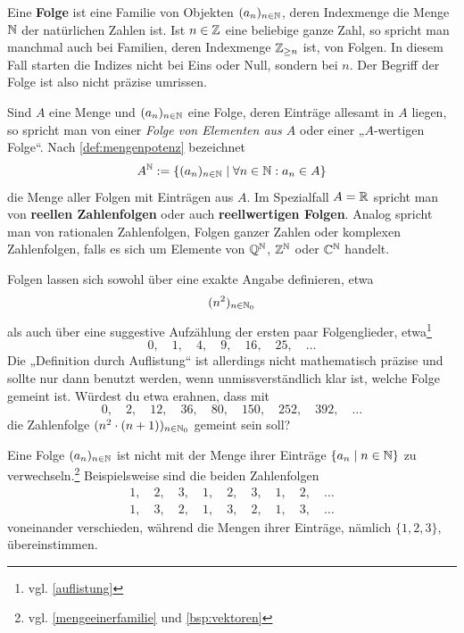 \begin{defin}[Folge] \label{def:folge} 
    Eine \textbf{Folge} ist eine Familie von Objekten $(a_n)_{n\in \mathbb N}$, deren Indexmenge die Menge $\mathbb N$ der natürlichen Zahlen ist. Ist $n\in \mathbb Z$ eine beliebige ganze Zahl, so spricht man manchmal auch bei Familien, deren Indexmenge $\mathbb Z_{\ge n}$ ist, von Folgen. In diesem Fall starten die Indizes nicht bei Eins oder Null, sondern bei $n$. Der Begriff der Folge ist also nicht präzise umrissen.
    
    Sind $A$ eine Menge und $(a_n)_{n\in \mathbb N}$ eine Folge, deren Einträge allesamt in $A$ liegen, so spricht man von einer \emph{Folge von Elementen aus $A$} oder einer „$A$-wertigen Folge“. Nach \cref{def:mengenpotenz} bezeichnet
    \[ A^\mathbb N := \{ (a_n)_{n\in \mathbb N} \mid \forall n\in \mathbb N: a_n\in A \} \]
    die Menge aller Folgen mit Einträgen aus $A$. Im Spezialfall $A=\mathbb R$ spricht man von \textbf{reellen Zahlenfolgen} oder auch \textbf{reellwertigen Folgen}. Analog spricht man von rationalen Zahlenfolgen, Folgen ganzer Zahlen oder komplexen Zahlenfolgen, falls es sich um Elemente von $\mathbb Q^\mathbb N$, $\mathbb Z^\mathbb N$ oder $\mathbb C^\mathbb N$ handelt.
\end{defin}


\begin{nota}
    Folgen lassen sich sowohl über eine exakte Angabe definieren, etwa
    \begin{align*}
        (n^2)_{n\in \mathbb N_0}
    \end{align*}
    als auch über eine suggestive Aufzählung der ersten paar Folgenglieder, etwa\footnote{vgl. \cref{auflistung}}
        \[ 0,\quad 1,\quad 4,\quad 9,\quad 16,\quad 25,\quad\dots \]
    Die „Definition durch Auflistung“ ist allerdings nicht mathematisch präzise und sollte nur dann benutzt werden, wenn unmissverständlich klar ist, welche Folge gemeint ist. Würdest du etwa erahnen, dass mit
        \[ 0,\quad 2,\quad 12,\quad 36,\quad 80,\quad 150,\quad 252,\quad 392,\quad \dots\]
    die Zahlenfolge $(n^2\cdot (n+1))_{n\in \mathbb N_0}$ gemeint sein soll?
\end{nota}


\begin{bem}
    Eine Folge $(a_n)_{n\in \mathbb N}$ ist nicht mit der Menge ihrer Einträge $\{a_n\mid n\in \mathbb N\}$ zu verwechseln.\footnote{vgl. \cref{mengeeinerfamilie} und \cref{bsp:vektoren}} Beispielsweise sind die beiden Zahlenfolgen
    \begin{align*}
        1,\quad 2,\quad 3,\quad 1,\quad 2,\quad 3,\quad 1,\quad 2,\quad \dots \\
        1,\quad 3,\quad 2,\quad 1,\quad 3,\quad 2,\quad 1,\quad 3,\quad \dots
    \end{align*}
    voneinander verschieden, während die Mengen ihrer Einträge, nämlich $\{1,2,3\}$, übereinstimmen.
\end{bem}



